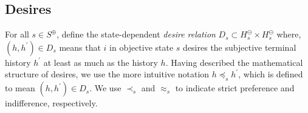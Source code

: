 \documentclass[
11pt,
titlepage,
reqno,
]{article}%
\theoremstyle{definition}
\begin{document}
%	
%	


\subsection{Desires} \label{sec: desires}
For all $s\in S^\oplus$, define the state-dependent \textit{desire relation}    $D_s\subset H^\ominus_s\times H^\ominus_s$ where, $(h,h^{\prime})\in D_s$ means that  $i$ in objective state $s$ desires the subjective terminal history $h^{\prime}$ at least as much as the history $h$. 
Having described the mathematical structure of desires, we use the more intuitive notation $h\preceq_s h^{\prime}$, which is defined to mean $(h,h^{\prime})\in D_s$. 
We use $\prec_s$ and $\approx_s$ to indicate strict preference and indifference, respectively. 
	
\end{document}

